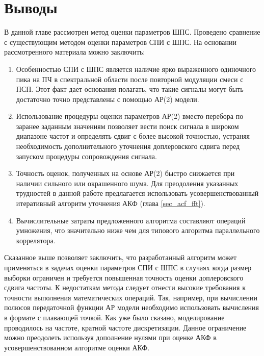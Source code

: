\section{Выводы}

В данной главе рассмотрен метод оценки параметров ШПС. Проведено сравнение с существующим методом оценки параметров СПИ с ШПС. На основании рассмотренного материала можно заключить:
\begin{enumerate}
\item Особенностью СПИ с ШПС является наличие ярко выраженного одиночного пика на ПЧ в спектральной области после повторной модуляции смеси с ПСП.
	Этот факт дает основания полагать, что такие сигналы могут быть достаточно точно представлены с помощью АР(2) модели.
\item Использование процедуры оценки параметров АР(2) вместо перебора по заранее заданным значениям позволяет вести поиск сигнала в широком диапазоне частот и определять сдвиг
	с более высокой точностью, устраняя необходимость дополнительного уточнения доплеровского сдвига перед запуском процедуры сопровождения сигнала.
\item Точность оценок, полученных на основе АР(2) быстро снижается при наличии сильного или окрашенного шума. Для преодоления указанных трудностей в 
	данной работе предлагается использовать усовершенствованный итеративный алгоритм уточнения АКФ (глава \ref{sec_acf_fft}).
\item Вычислительные затраты предложенного алгоритма составляют   операций умножения, что значительно ниже чем  для типового алгоритма параллельного коррелятора.
\end{enumerate}

Сказанное выше позволяет заключить, что разработанный алгоритм может применяться в задачах оценки параметров СПИ с ШПС в случаях когда размер выборки ограничен и
требуется повышенная точность оценки доплеровского сдвига частоты. К недостаткам метода следует отнести высокие требования к точности выполнения математических операций.
Так, например, при вычислении полюсов передаточной функции АР модели необходимо использовать вычисления в формате с плавающей точкой. 
Как уже было сказано, моделирование проводилось на частоте, кратной частоте дискретизации. Данное ограничение можно преодолеть используя дополнение нулями при оценке АКФ
в усовершенствованном алгоритме оценки АКФ.

